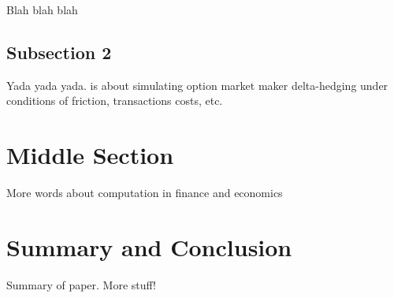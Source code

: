 \documentclass[11pt,]{article}
\begin{document}
Blah blah blah

\subsection{Subsection 2}\label{subsection-2}

Yada yada yada. \citet{Figlewski1989} is about simulating option market
maker delta-hedging under conditions of friction, transactions costs,
etc.

\section{Middle Section}\label{middle-section}

More words about computation in finance and economics

\section{Summary and Conclusion}\label{summary-and-conclusion}

Summary of paper. More stuff!

\newpage
\singlespacing 

\end{document}
